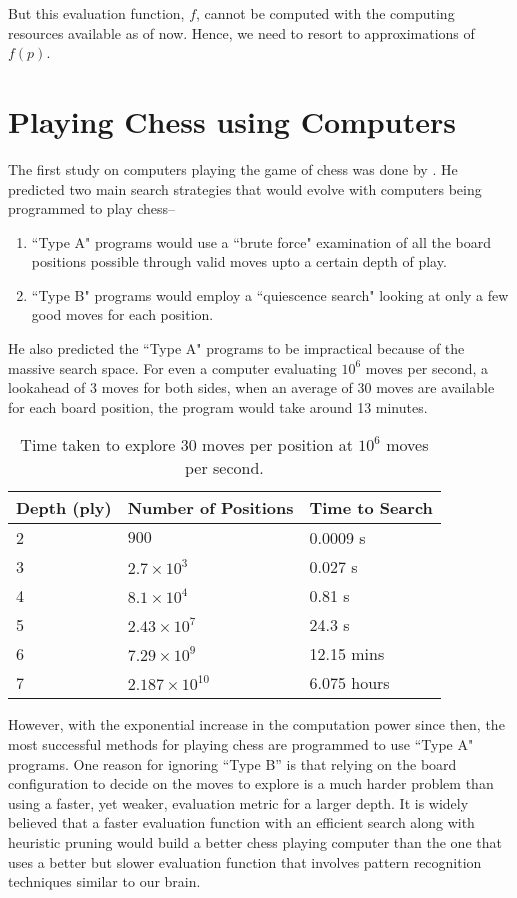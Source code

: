 But this evaluation function, $f$, cannot be computed with the computing 
resources available as of now. Hence, we need to resort to approximations of 
$f(p)$.


\section*{Playing Chess using Computers}
\label{section:playing-background}
The first study on computers playing the game of chess was done by 
\citet{shannon1950xxii}. He predicted two main search strategies that would 
evolve with computers being programmed to play chess--
\begin{enumerate}
\item ``Type A" programs would use a ``brute force" examination of all the board 
positions possible through valid moves upto a certain depth of play.
\item ``Type B" programs would employ a ``quiescence search" looking at only a 
few good moves for each position. 
\end{enumerate}
He also predicted the ``Type A" programs to be impractical because of the 
massive search space. For even a computer evaluating $10^6$ moves per second, a 
lookahead of 3 moves for both sides, when an average of 30 moves are available 
for each board position, the program would take around 13 minutes.\\
\begin{table}[h]
\centering
\begin{tabular}{lll}
\toprule
Depth (ply) & Number of Positions & Time to Search \\ 
\midrule
2           & $900$                 & 0.0009 s       \\ 
3           & $2.7\times10^3$       & 0.027 s        \\ 
4           & $8.1\times10^4$       & 0.81 s         \\ 
5           & $2.43\times 10^7$    & 24.3 s         \\ 
6           & $7.29\times 10^9$    & 12.15 mins     \\ 
7           & $2.187\times 10^{10}$& 6.075 hours    \\ \bottomrule
\end{tabular}
\caption{Time taken to explore 30 moves per position at $10^6$ moves per 
second.}
\label{table:time-taken}
\end{table}

However, with the exponential increase in the computation power since then, the 
most successful methods for playing chess are programmed to use ``Type A" 
programs. One reason for ignoring ``Type B'' is that relying on the board 
configuration to decide on the moves to explore is a much harder problem than 
using a faster, yet weaker, evaluation metric for a larger depth. It is widely 
believed that a faster evaluation function with an efficient search along with 
heuristic pruning would build a better chess playing computer than the one that 
uses a better but slower evaluation function that involves pattern recognition 
techniques similar to our brain.

